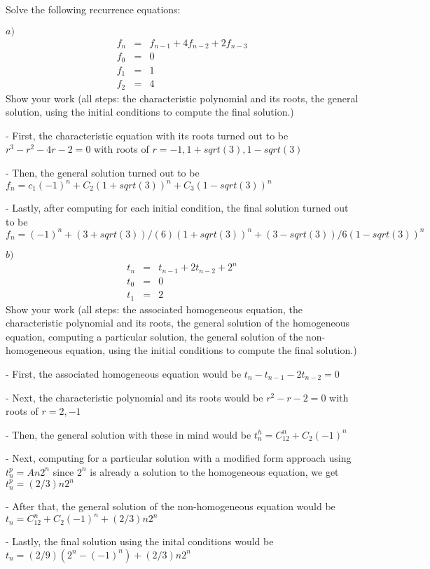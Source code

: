 \documentclass{article}
\begin{document}
\begin{problem}
Solve the following recurrence equations:

%
$a)$
\begin{eqnarray*}
        f_n &=& f_{n-1} + 4f_{n-2} + 2f_{n-3}\\
        f_0 &=& 0 \\
        f_1 &=& 1 \\
	f_2 &=& 4 
\end{eqnarray*}
%
Show your work (all steps: the characteristic polynomial and its roots, the general solution, 
using the initial conditions to compute the final solution.)

\vspace{0.1in} - First, the characteristic equation with its roots turned out to be $r^3-r^2-4r-2=0$ with roots of $r=-1,1+sqrt(3),1-sqrt(3)$

\vspace{0.1in} - Then, the general solution turned out to be $f_n=c_1(-1)^n+C_2(1+sqrt(3))^n+C_3(1-sqrt(3))^n$

\vspace{0.1in} - Lastly, after computing for each initial condition, the final solution turned out to be $f_n=(-1)^n+ (3+sqrt(3))/(6) (1+sqrt(3))^n+(3-sqrt(3))/6(1-sqrt(3))^n$

\vskip 0.1in

$b)$
\begin{eqnarray*}
        t_n &=& t_{n-1} + 2t_{n-2} + 2^n\\
        t_0 &=& 0 \\
        t_1 &=& 2
\end{eqnarray*}
%
Show your work (all steps: the associated homogeneous equation,
the characteristic polynomial and its
roots, the general solution of the homogeneous
equation, computing a particular solution,
the general solution of the non-homogeneous equation,
using the initial conditions to compute the final solution.)

\vspace{0.1in} - First, the associated homogeneous equation would be $t_n-t_{n-1}-2t_{n-2}=0$

\vspace{0.1in} - Next, the characteristic polynomial and its roots would be $r^2-r-2=0$ with roots of $r=2,-1$

\vspace{0.1in} - Then, the general solution with these in mind would be $t^h_n=C_12^n+C_2(-1)^n$

\vspace{0.1in} - Next, computing for a particular solution with a modified form approach using $t^p_n=An2^n$ since $2^n$ is already a solution to the homogeneous equation, we get $t^p_n= (2/3)n2^n$

\vspace{0.1in} - After that, the general solution of the non-homogeneous equation would be $t_n=C_12^n+C_2(-1)^n+(2/3)n2^n$

\vspace{0.1in} - Lastly, the final solution using the inital conditions would be $t_n=(2/9)(2^n-(-1)^n)+(2/3)n2^n$

%
\end{problem}
\end{document}
